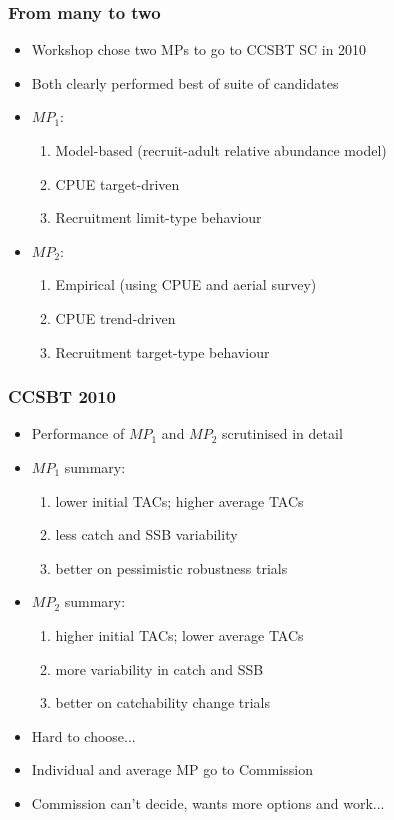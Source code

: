 \documentclass{beamer}
\begin{document}
\begin{frame}
    \frametitle{From many to two}
\begin{itemize}
    \item Workshop chose two MPs to go to CCSBT SC in 2010
    \item Both clearly performed best of suite of candidates
    \item $MP_1$:
        \begin{enumerate}
            \item Model-based (recruit-adult relative abundance model)
            \item CPUE target-driven
            \item Recruitment limit-type behaviour
        \end{enumerate}
    \item $MP_2$:
        \begin{enumerate}
            \item Empirical (using CPUE and aerial survey)
            \item CPUE trend-driven
            \item Recruitment target-type behaviour
        \end{enumerate} 
\end{itemize}
\end{frame}
\begin{frame}
    \frametitle{CCSBT 2010}
\begin{itemize}
    \item Performance of $MP_1$ and $MP_2$ scrutinised in detail
    \item $MP_1$ summary:
        \begin{enumerate}
            \item lower initial TACs; higher average TACs 
            \item less catch and SSB variability
            \item better on pessimistic robustness trials
        \end{enumerate}
    \item $MP_2$ summary:
        \begin{enumerate}
            \item higher initial TACs; lower average TACs
            \item more variability in catch and SSB
            \item better on catchability change trials
        \end{enumerate}
    \item Hard to choose...
    \item Individual and average MP go to Commission
    \item Commission can't decide, wants more options and work...
\end{itemize}
\end{frame}
\end{document}
